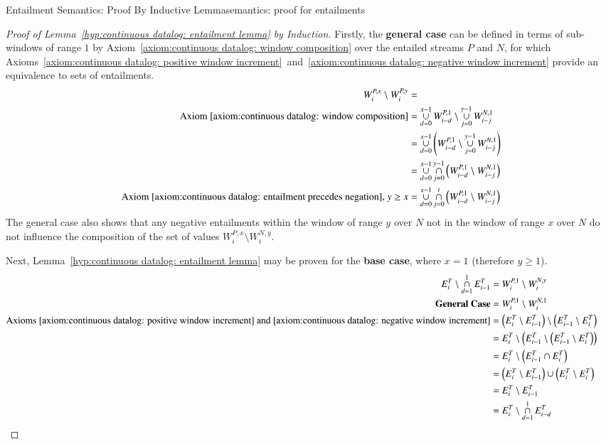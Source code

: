 \begin{nestedsection}{Entailment Semantics: Proof By Inductive Lemma}{semantics: proof for entailments}
\begin{proof}[Proof of Lemma~\ref{hyp:continuous datalog: entailment lemma} by Induction]
		Firstly, the \textbf{general case} can be defined in terms of sub-windows of range $1$ by Axiom~\ref{axiom:continuous datalog: window composition} over the entailed streams $P$ and $N$, for which Axioms~\ref{axiom:continuous datalog: positive window increment}~and~\ref{axiom:continuous datalog: negative window increment} provide an equivalence to sets of entailments.
		\begin{align*}
			W^{P,x}_{i} \setminus W^{P,y}_{i} & = \\
			\text{Axiom~\ref{axiom:continuous datalog: window composition}} & = \mathop{\cup}^{x-1}_{d=0}W^{P,1}_{i-d} \setminus \mathop{\cup}^{y-1}_{j=0}W^{N,1}_{i-j} \\
			& = \mathop{\cup}^{x-1}_{d=0} \left( W^{P,1}_{i-d} \setminus \mathop{\cup}^{y-1}_{j=0}W^{N,1}_{i-j} \right) \\
			& = \mathop{\cup}^{x-1}_{d=0}\mathop{\cap}^{y-1}_{j=0} \left( W^{P,1}_{i-d} \setminus W^{N,1}_{i-j} \right) \\
			\text{Axiom~\ref{axiom:continuous datalog: entailment precedes negation}, } y \geq x & = \mathop{\cup}^{x-1}_{d=0}\mathop{\cap}^{i}_{j=0} \left( W^{P,1}_{i-d} \setminus W^{N,1}_{i-j} \right)
		\end{align*}
		The general case also shows that any negative entailments within the window of range $y$ over $N$ not in the window of range $x$ over $N$ do not influence the composition of the set of values ${W^{P,x}_{i} \setminus W^{N,y}_{i}}$.

		Next, Lemma~\ref{hyp:continuous datalog: entailment lemma} may be proven for the \textbf{base case}, where ${x = 1}$ (therefore ${y \geq 1}$).
		\begin{align*}
			E^T_{i} \setminus \mathop{\cap}^{1}_{d=1} E^T_{i-1} & = W^{P,1}_{i} \setminus W^{N,y}_{i} \\
			\text{\textbf{General Case}} & = W^{P,1}_{i} \setminus W^{N,1}_{i} \\
			\text{Axioms~\ref{axiom:continuous datalog: positive window increment}~and~\ref{axiom:continuous datalog: negative window increment}} & = \left( E^T_{i} \setminus E^T_{i-1} \right) \setminus \left( E^T_{i-1} \setminus E^T_{i} \right) \\
			& = E^T_{i} \setminus \left( E^T_{i-1} \setminus \left( E^T_{i-1} \setminus E^T_{i} \right) \right) \\
			& = E^T_{i} \setminus \left( E^T_{i-1} \cap E^T_{i} \right) \\
			& = \left( E^T_{i} \setminus E^T_{i-1} \right) \cup \left( E^T_{i} \setminus E^T_{i} \right) \\
			& = E^T_{i} \setminus E^T_{i-1} \\
			& = E^T_{i} \setminus \mathop{\cap}^{1}_{d=1} E^T_{i-d} && \qedhere
		\end{align*}


\end{proof}
\end{nestedsection}
